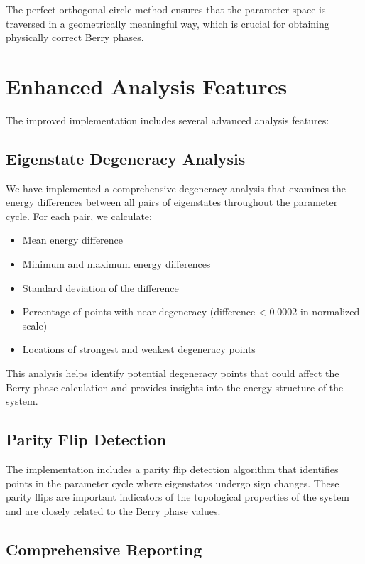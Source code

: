 \documentclass[12pt,a4paper]{article}
\begin{document}
The perfect orthogonal circle method ensures that the parameter space is traversed in a geometrically meaningful way, which is crucial for obtaining physically correct Berry phases.

\section{Enhanced Analysis Features}

The improved implementation includes several advanced analysis features:

\subsection{Eigenstate Degeneracy Analysis}

We have implemented a comprehensive degeneracy analysis that examines the energy differences between all pairs of eigenstates throughout the parameter cycle. For each pair, we calculate:

\begin{itemize}
    \item Mean energy difference
    \item Minimum and maximum energy differences
    \item Standard deviation of the difference
    \item Percentage of points with near-degeneracy (difference < 0.0002 in normalized scale)
    \item Locations of strongest and weakest degeneracy points
\end{itemize}

This analysis helps identify potential degeneracy points that could affect the Berry phase calculation and provides insights into the energy structure of the system.

\subsection{Parity Flip Detection}

The implementation includes a parity flip detection algorithm that identifies points in the parameter cycle where eigenstates undergo sign changes. These parity flips are important indicators of the topological properties of the system and are closely related to the Berry phase values.

\subsection{Comprehensive Reporting}
\end{document}
